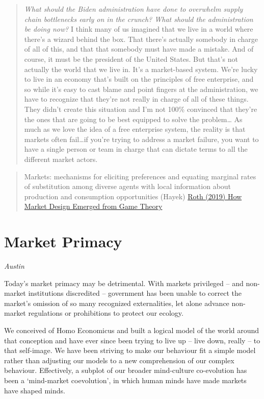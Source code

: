 \documentclass[
]{book}
\begin{document}
\begin{quote}
\emph{What should the Biden administration have done to overwhelm supply chain bottlenecks early on in the crunch? What should the administration be doing now?}
I think many of us imagined that we live in a world where there's a wizard behind the box. That there's actually somebody in charge of all of this, and that that somebody must have made a mistake. And of course, it must be the president of the United States. But that's not actually the world that we live in. It's a market-based system. We're lucky to live in an economy that's built on the principles of free enterprise, and so while it's easy to cast blame and point fingers at the administration, we have to recognize that they're not really in charge of all of these things. They didn't create this situation and I'm not 100\% convinced that they're the ones that are going to be best equipped to solve the problem\ldots{}
As much as we love the idea of a free enterprise system, the reality is that markets often fail\ldots if you're trying to address a market failure, you want to have a single person or team in charge that can dictate terms to all the different market actors.
\end{quote}

\begin{quote}
Markets: mechanisms for eliciting preferences and equating marginal rates of substitution
among diverse agents with local information about production and consumption
opportunities (Hayek) \href{https://www.aeaweb.org/articles?id=10.1257/jep.33.3.118}{Roth (2019) How Market Design Emerged from Game Theory}
\end{quote}

\hypertarget{market-primacy-1}{%
\section{Market Primacy}\label{market-primacy-1}}

\emph{Austin}

Today's market primacy may be detrimental. With markets privileged -- and non-market institutions discredited -- government has been unable to correct the market's omission of so many recognized externalities, let alone advance non-market regulations or prohibitions to protect our ecology.

We conceived of Homo Economicus and built a logical model of the world around that conception and have ever since been trying to live up -- live down, really -- to that self-image. We have been striving to make our behaviour fit a simple model rather than adjusting our models to a new comprehension of our complex behaviour. Effectively, a subplot of our broader mind-culture co-evolution has been a `mind-market coevolution', in which human minds have made markets have shaped minds.
\end{document}
